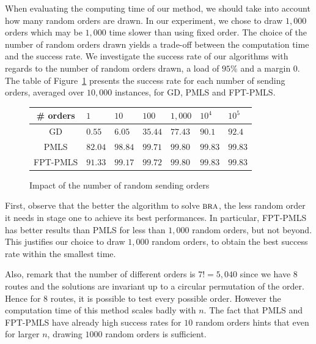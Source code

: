 \documentclass[10pt, conference, letterpaper]{IEEEtran}
\newcommand\bra{\textsc{bra}\xspace}
\begin{document}
    When evaluating the computing time of our method, we should take into account how many random orders are drawn. In our experiment, we chose to draw $1,000$ orders which may be 
    $1,000$ time slower than using fixed order. The choice of the number of random orders drawn yields a trade-off between the computation time and the success rate. 
    We investigate the success rate of our algorithms with regards to the number of random orders drawn, a load of $95\%$ and a margin $0$. The table of Figure~\ref{fig:randomdrawing} presents the success rate for each number of sending orders, averaged over $10,000$ instances, for GD, PMLS and FPT-PMLS.
         \begin{figure}[h] 
       \begin{center}
   \begin{tabularx}{0.5\textwidth}{|c|X|X|X|X|X|X|}
    \hline
    \# orders& $1$ & $10$ & $100$& $1,000$& $10^{4}$&$10^{5}$\\
    \hline
    GD & $0.55$ &$6.05$&$35.44$&$77.43$&$90.1$&$92.4$\\
    \hline
  PMLS & $82.04$ &$98.84$&$99.71$&$99.80$&$99.83$&$99.83$\\
    \hline
    FPT-PMLS & $91.33$&$99.17$&$99.72$&$99.80$ &$99.83$&$99.83$\\
    \hline
      \end{tabularx}
      \end{center}
   \caption{Impact of the number of random sending orders}
        \label{fig:randomdrawing}
     \end{figure}

First, observe that the better the algorithm to solve $\bra$, the less random order it needs in stage one to achieve its best performances. In particular, FPT-PMLS has better results than PMLS for less than $1,000$ random orders, but not beyond. This justifies our choice to draw $1,000$ random orders, to obtain the best success rate within the smallest time.

Also, remark that the number of different orders is $7!= 5,040$ since we have $8$ routes and the solutions are invariant up to a circular permutation of the order. Hence for $8$ routes, it is possible to test every possible order. However the computation time of this method scales badly with $n$. The fact that PMLS and FPT-PMLS have already high success rates for $10$ random orders hints that even for larger $n$, drawing $1000$ random orders is sufficient.
\end{document}
